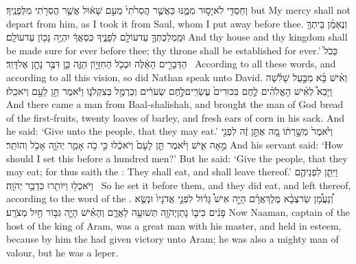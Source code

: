 {וְחַסְדִּ֖י לֹא\maqqaf יָס֣וּר מִמֶּ֑נּוּ כַּאֲשֶׁ֤ר הֲסִרֹ֙תִי֙ מֵעִ֣ם שָׁא֔וּל אֲשֶׁ֥ר הֲסִרֹ֖תִי מִלְּפָנֶֽיךָ׃}
{but My mercy shall not depart from him, as I took it from Saul, whom I put away before thee.}
{וְנֶאְמַ֨ן בֵּיתְךָ֧ וּמַֽמְלַכְתְּךָ֛ עַד\maqqaf עוֹלָ֖ם לְפָנֶ֑יךָ כִּֽסְאֲךָ֔ יִהְיֶ֥ה נָכ֖וֹן עַד\maqqaf עוֹלָֽם׃}
{And thy house and thy kingdom shall be made sure for ever before thee; thy throne shall be established for ever.’}
{כְּכֹל֙ הַדְּבָרִ֣ים הָאֵ֔לֶּה וּכְכֹ֖ל הַחִזָּי֣וֹן הַזֶּ֑ה כֵּ֛ן דִּבֶּ֥ר נָתָ֖ן אֶל\maqqaf דָּוִֽד׃ \petucha }
{According to all these words, and according to all this vision, so did Nathan speak unto David.}
\newperek
{}
\label{haft_27}
\setcounter{chap}{4}
\setcounter{verse}{42}
{וְאִ֨ישׁ בָּ֜א מִבַּ֣עַל שָׁלִ֗שָׁה וַיָּבֵא֩ לְאִ֨ישׁ הָאֱלֹהִ֜ים לֶ֤חֶם בִּכּוּרִים֙ עֶשְׂרִֽים\maqqaf לֶ֣חֶם שְׂעֹרִ֔ים וְכַרְמֶ֖ל בְּצִקְלֹנ֑וֹ וַיֹּ֕אמֶר תֵּ֥ן לָעָ֖ם וְיֹאכֵֽלוּ׃}
{And there came a man from Baal-shalishah, and brought the man of God bread of the first-fruits, twenty loaves of barley, and fresh ears of corn in his sack. And he said: ‘Give unto the people, that they may eat.’}
{וַיֹּ֙אמֶר֙ מְשָׁ֣רְת֔וֹ מָ֚ה אֶתֵּ֣ן זֶ֔ה לִפְנֵ֖י מֵ֣אָה אִ֑ישׁ וַיֹּ֗אמֶר תֵּ֤ן לָעָם֙ וְיֹאכֵ֔לוּ כִּ֣י כֹ֥ה אָמַ֛ר יְהֹוָ֖ה אָכֹ֥ל וְהוֹתֵֽר׃}
{And his servant said: ‘How should I set this before a hundred men?’ But he said: ‘Give the people, that they may eat; for thus saith the \lord: They shall eat, and shall leave thereof.’}
{וַיִּתֵּ֧ן לִפְנֵיהֶ֛ם וַיֹּאכְל֥וּ וַיּוֹתִ֖רוּ כִּדְבַ֥ר יְהֹוָֽה׃ \petucha }
{So he set it before them, and they did eat, and left thereof, according to the word of the \lord.}
\newperek
{}
{וְ֠נַעֲמָ֠ן שַׂר\maqqaf צְבָ֨א מֶלֶךְ\maqqaf אֲרָ֜ם הָיָ֣ה אִישׁ֩ גָּד֨וֹל לִפְנֵ֤י אֲדֹנָיו֙ וּנְשֻׂ֣א פָנִ֔ים כִּי\maqqaf ב֛וֹ נָתַן\maqqaf יְהֹוָ֥ה תְּשׁוּעָ֖ה לַאֲרָ֑ם וְהָאִ֗ישׁ הָיָ֛ה גִּבּ֥וֹר חַ֖יִל מְצֹרָֽע׃}
{Now Naaman, captain of the host of the king of Aram, was a great man with his master, and held in esteem, because by him the \lord\space had given victory unto Aram; he was also a mighty man of valour, but he was a leper.}
